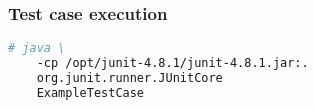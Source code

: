 \begin{frame}[fragile, hasnext=false, hasprev=false]
\frametitle{Test case execution}
\label{example:junit-testcase-execution}

\begin{lstlisting}[language=bash]
# java \
	-cp /opt/junit-4.8.1/junit-4.8.1.jar:.
	org.junit.runner.JUnitCore
	ExampleTestCase
\end{lstlisting}
\end{frame}

